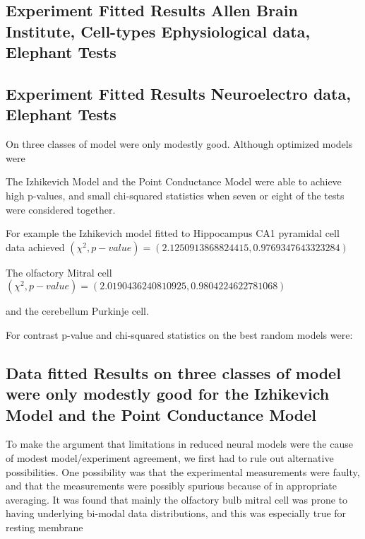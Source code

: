 
\subsection{Experiment Fitted Results Allen Brain Institute, Cell-types Ephysiological data, Elephant Tests}


\subsection{Experiment Fitted Results Neuroelectro data, Elephant Tests}

On three classes of model were only modestly good. Although optimized models were  


The Izhikevich Model and the Point Conductance Model were able to achieve high p-values, and small chi-squared statistics when seven or eight of the tests were considered together.

For example the Izhikevich model fitted to Hippocampus CA1 pyramidal cell data achieved $ (\chi^{2} ,p-value) =(2.1250913868824415, 0.9769347643323284) $

The olfactory Mitral cell
$ (\chi^{2} ,p-value) =(2.0190436240810925, 0.9804224622781068) $

and the cerebellum Purkinje cell.


For contrast p-value and chi-squared statistics on the best random models were:

\subsection{Data fitted Results on three classes of model were only modestly good for the Izhikevich Model and the Point Conductance Model}

To make the argument that limitations in reduced neural models were the cause of modest model/experiment agreement, we first had to rule out alternative possibilities. One possibility was that the experimental measurements were faulty, and that the measurements were possibly spurious because of in appropriate averaging. It was found that mainly the olfactory bulb mitral cell was prone to having underlying bi-modal data distributions, and this was especially true for resting membrane

